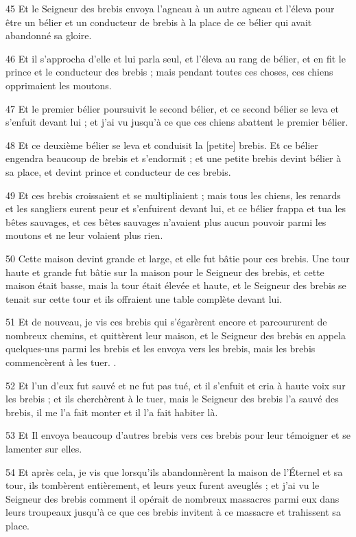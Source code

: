 \par 45 Et le Seigneur des brebis envoya l'agneau à un autre agneau et l'éleva pour être un bélier et un conducteur de brebis à la place de ce bélier qui avait abandonné sa gloire.
\par 46 Et il s'approcha d'elle et lui parla seul, et l'éleva au rang de bélier, et en fit le prince et le conducteur des brebis ; mais pendant toutes ces choses, ces chiens opprimaient les moutons.
\par 47 Et le premier bélier poursuivit le second bélier, et ce second bélier se leva et s'enfuit devant lui ; et j'ai vu jusqu'à ce que ces chiens abattent le premier bélier.
\par 48 Et ce deuxième bélier se leva et conduisit la [petite] brebis. Et ce bélier engendra beaucoup de brebis et s'endormit ; et une petite brebis devint bélier à sa place, et devint prince et conducteur de ces brebis.
\par 49 Et ces brebis croissaient et se multipliaient ; mais tous les chiens, les renards et les sangliers eurent peur et s'enfuirent devant lui, et ce bélier frappa et tua les bêtes sauvages, et ces bêtes sauvages n'avaient plus aucun pouvoir parmi les moutons et ne leur volaient plus rien.
\par 50 Cette maison devint grande et large, et elle fut bâtie pour ces brebis. Une tour haute et grande fut bâtie sur la maison pour le Seigneur des brebis, et cette maison était basse, mais la tour était élevée et haute, et le Seigneur des brebis se tenait sur cette tour et ils offraient une table complète devant lui.
\par 51 Et de nouveau, je vis ces brebis qui s'égarèrent encore et parcoururent de nombreux chemins, et quittèrent leur maison, et le Seigneur des brebis en appela quelques-uns parmi les brebis et les envoya vers les brebis, mais les brebis commencèrent à les tuer. .
\par 52 Et l'un d'eux fut sauvé et ne fut pas tué, et il s'enfuit et cria à haute voix sur les brebis ; et ils cherchèrent à le tuer, mais le Seigneur des brebis l'a sauvé des brebis, il me l'a fait monter et il l'a fait habiter là.
\par 53 Et Il envoya beaucoup d'autres brebis vers ces brebis pour leur témoigner et se lamenter sur elles.
\par 54 Et après cela, je vis que lorsqu'ils abandonnèrent la maison de l'Éternel et sa tour, ils tombèrent entièrement, et leurs yeux furent aveuglés ; et j'ai vu le Seigneur des brebis comment il opérait de nombreux massacres parmi eux dans leurs troupeaux jusqu'à ce que ces brebis invitent à ce massacre et trahissent sa place.
